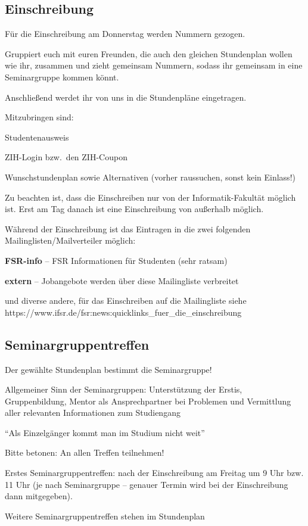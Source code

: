 \documentclass[a4paper,12pt]{report}
\begin{document}
\subsection{Einschreibung}
\begin{itemize*}
	\item Für die Einschreibung am Donnerstag werden Nummern gezogen.
	\item Gruppiert euch mit euren Freunden, die auch den gleichen Stundenplan wollen wie ihr, zusammen und zieht gemeinsam Nummern, sodass ihr gemeinsam in eine Seminargruppe kommen könnt.
	\item Anschließend werdet ihr von uns in die Stundenpläne eingetragen.
	\item Mitzubringen sind:
	\begin{itemize*}
		\item Studentenausweis
		\item ZIH-Login bzw.\ den ZIH-Coupon
		\item Wunschstundenplan sowie Alternativen (vorher raussuchen, sonst kein Einlass!)
	\end{itemize*}
	\item Zu beachten ist, dass die Einschreiben nur von der Informatik-Fakultät möglich ist. Erst am Tag danach ist eine Einschreibung von außerhalb möglich.
	\item Während der Einschreibung ist das Eintragen in die zwei folgenden Mailinglisten/Mailverteiler möglich:
	\begin{itemize*}
		\item \textbf{FSR-info} -- FSR Informationen für Studenten (sehr ratsam)
		\item \textbf{extern} -- Jobangebote werden über diese Mailingliste verbreitet
		\item und diverse andere, für das Einschreiben auf die Mailingliste siehe \\ https://www.ifsr.de/fsr:news:quicklinks\_fuer\_die\_einschreibung
	\end{itemize*}
\end{itemize*}

\subsection{Seminargruppentreffen}
\begin{itemize*}
	\item Der gewählte Stundenplan bestimmt die Seminargruppe!
	\item Allgemeiner Sinn der Seminargruppen: Unterstützung der Erstis, Gruppenbildung, Mentor als Ansprechpartner bei Problemen und Vermittlung aller relevanten Informationen zum Studiengang
	\item \enquote{Als Einzelgänger kommt man im Studium nicht weit}
	\item Bitte betonen: An allen Treffen teilnehmen!
	\item Erstes Seminargruppentreffen: nach der Einschreibung am Freitag um 9 Uhr bzw. 11 Uhr (je nach Seminargruppe -- genauer Termin wird bei der Einschreibung dann mitgegeben).
	\item Weitere Seminargruppentreffen stehen im Stundenplan
\end{itemize*}
\end{document}
